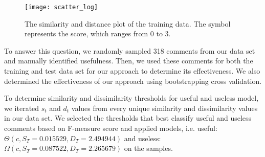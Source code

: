 \begin{figure}[!t]
\centering
\texttt{[image: scatter\_log]}
\caption{The similarity and distance plot of the training data.
The symbol represents the score, which ranges from 0 to 3.}
\label{fig:scatter}
\end{figure}

To answer this question, we randomly sampled 318 comments from our data set and manually identified usefulness.
Then, we used these comments for both the training and test data set for our approach to determine its effectiveness.
We also determined the effectiveness of our approach using bootstrapping cross validation.


%

To determine similarity and dissimilarity thresholds for useful and useless model, we iterated $s_t$ and $d_t$ values from every unique similarity and dissimilarity values in our data set.
We selected the thresholds that best classify useful and useless comments based on F-measure score and applied models, i.e. useful: $\Theta(c,S_T=0.015529,D_T=2.494944)$ and useless: $\Omega(c,S_T=0.087522,D_T=2.265679)$ on the samples. 



